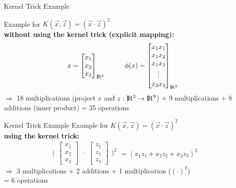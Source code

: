 \documentclass{beamer}
\begin{document}
\begin{frame}{Kernel Trick Example}

Example for $K(\vec{x}, \vec{z}) = (\vec{x} \cdot \vec{z})^2$\\
\textbf{without using the kernel trick (explicit mapping):}
\begin{equation*}
  \begin{aligned}
    x &= \begin{bmatrix}
           x_{1} \\
           x_{2} \\
           x_{3}
         \end{bmatrix}_{\rm I\!R^3}
  \end{aligned}
  \qquad
    \begin{aligned}
    \phi(x) &= \begin{bmatrix}
           x_{1}x_{1} \\
           x_{1}x_2 \\
           x_{1}x_3 \\
           \vdots \\
           x_3 x_3
         \end{bmatrix}_{\rm I\!R^9}
  \end{aligned}
\end{equation*}
$\Rightarrow$ 18 multiplications (project $x$ and $z:{\rm I\!R^3} \rightarrow {\rm I\!R^9}$) + 9 multiplications + 8 additions (inner product) = 35 operations
\end{frame}



\begin{frame}{Kernel Trick Example}
Example for $K(\vec{x}, \vec{z}) = (\vec{x} \cdot \vec{z})^2$\\
\textbf{using the kernel trick:}
\begin{equation*}
\Bigg(
  \begin{aligned}
    \begin{bmatrix}
           x_{1} \\
           x_{2} \\
           x_{3}
         \end{bmatrix}
  \end{aligned}
  \cdot
    \begin{aligned}
    \begin{bmatrix}
           z_{1} \\
           z_{1} \\
           z_{1}
         \end{bmatrix}
  \end{aligned}\Bigg)^2
  \begin{aligned}
		= (x_1z_1+x_2z_2+x_3z_3)^2
	\end{aligned}
  \end{equation*}
$\Rightarrow$ 3 multiplications + 2 additions + 1 multiplication ($(\cdot)^2$)\\ = 6 operations
\end{frame}
\end{document}
